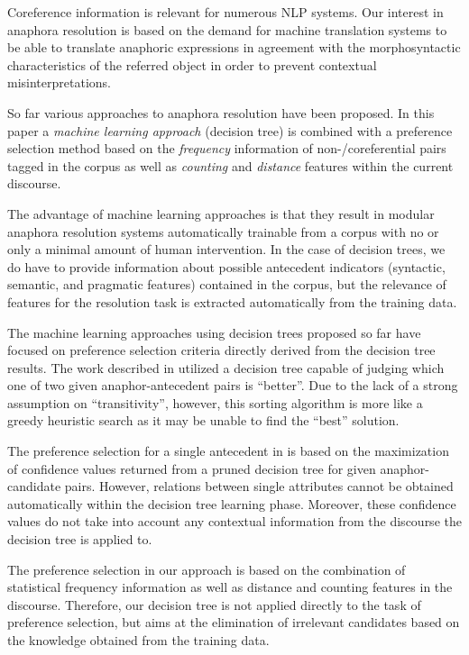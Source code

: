 Coreference information is relevant for numerous NLP systems.
Our interest in anaphora resolution is based on the demand for machine translation
systems to be able to translate anaphoric expressions in agreement with
the morphosyntactic characteristics of the referred object in order to prevent contextual
misinterpretations.

So far various approaches to anaphora resolution have been proposed.
In this paper a {\em machine learning approach} (decision tree) is combined with a preference
selection method based on the {\em frequency} information of non-/coreferential pairs tagged
in the corpus as well as {\em counting} and {\em distance} features within the current discourse.

The advantage of machine learning approaches is that they result in modular anaphora
resolution systems automatically trainable from a corpus with no or only a minimal
amount of human intervention. In the case of decision trees, we do have to provide information
about possible antecedent indicators (syntactic, semantic, and pragmatic features) contained
in the corpus, but the relevance of features for the resolution task is extracted
automatically from the training data.

The machine learning approaches using decision trees proposed so far have focused on preference
selection criteria directly derived from the decision tree results.
The work described in \cite{Conolly94} utilized a decision tree capable of judging which one
of two given anaphor-antecedent pairs is ``better''. Due to the lack of a strong assumption on
``transitivity'', however, this sorting algorithm is more like a greedy heuristic search as it
may be unable to find the ``best'' solution.

The preference selection for a single antecedent in \cite{Aone95} is based on the maximization
of confidence values returned from a pruned decision tree for given anaphor-candidate pairs.
However, relations between single attributes cannot be obtained automatically within the
decision tree learning phase.
Moreover, these confidence values do not take into account any contextual information from the discourse 
the decision tree is applied to.

The preference selection in our approach is based on the combination of statistical
frequency information as well as distance and counting features in the discourse. Therefore, our decision
tree is not applied directly to the task of preference selection, but aims at the elimination
of irrelevant candidates based on the knowledge obtained from the training data.

